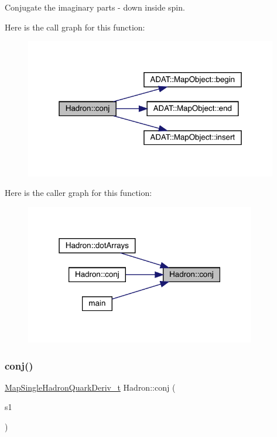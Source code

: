 Conjugate the imaginary parts -\/ down inside spin. 

Here is the call graph for this function\+:\nopagebreak
\begin{figure}[H]
\begin{center}
\leavevmode
\includegraphics[width=313pt]{d1/daf/namespaceHadron_a5b62c8e194d4e04483d980199eff43fa_cgraph}
\end{center}
\end{figure}
Here is the caller graph for this function\+:
\nopagebreak
\begin{figure}[H]
\begin{center}
\leavevmode
\includegraphics[width=286pt]{d1/daf/namespaceHadron_a5b62c8e194d4e04483d980199eff43fa_icgraph}
\end{center}
\end{figure}
\mbox{\label{namespaceHadron_a218b77b239d871def6267d4b34bdf7c1}} 
\subsubsection{\texorpdfstring{conj()}{conj()}\hspace{0.1cm}{\footnotesize\ttfamily [2/3]}}
{\footnotesize\ttfamily \mbox{\hyperlink{namespaceHadron_aa588220689caea8a6aad4d0296526e6b}{Map\+Single\+Hadron\+Quark\+Deriv\+\_\+t}} Hadron\+::conj (\begin{DoxyParamCaption}\item[{const \mbox{\hyperlink{namespaceHadron_aa588220689caea8a6aad4d0296526e6b}{Map\+Single\+Hadron\+Quark\+Deriv\+\_\+t}} \&}]{s1 }\end{DoxyParamCaption})}



